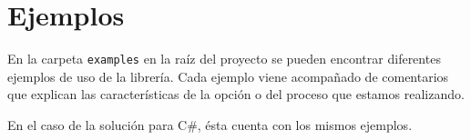 \documentclass[12pt,a4paper,final]{article}
\begin{document}
\section{Ejemplos}
	En la carpeta \texttt{examples} en la raíz del proyecto se pueden encontrar diferentes ejemplos
	de uso de la librería. Cada ejemplo viene acompañado de comentarios que explican las características
	de la opción o del proceso que estamos realizando.
	
	En el caso de la solución para C\#, ésta cuenta con los mismos ejemplos.	
\printindex
\end{document}
